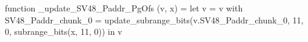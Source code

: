 function _update_SV48_Paddr_PgOfs (v, x) = let v = { v with SV48_Paddr_chunk_0 = update_subrange_bits(v.SV48_Paddr_chunk_0, 11, 0, subrange_bits(x, 11, 0)) } in
  v
